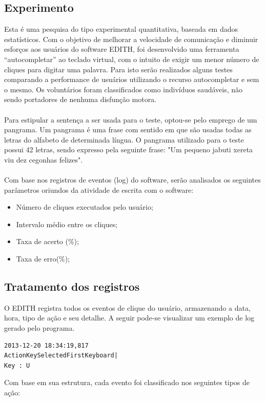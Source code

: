 \documentclass[twoside]{article}
\begin{document}
\begin{multicols}{2}
\subsection{Experimento}
Esta é uma pesquisa do tipo experimental quantitativa, baseada em dados estatísticos. Com o objetivo de melhorar a velocidade de comunicação e diminuir esforços aos usuários do software EDITH, foi desenvolvido uma ferramenta “autocompletar” ao teclado virtual, com o intuito de exigir um menor número de cliques para digitar uma palavra. Para isto serão realizados alguns testes comparando a performance de usuários utilizando o recurso autocompletar e sem o mesmo. Os voluntários foram classificados como indivíduos saudáveis, não sendo portadores de nenhuma disfunção motora. 
\\\\
Para estipular a sentença a ser usada para o teste, optou-se pelo emprego de um pangrama. Um pangrama é uma frase com sentido em que são usadas todas as letras do alfabeto de determinada língua. O pangrama utilizado para o teste possui 42 letras, sendo expresso pela seguinte frase: "Um pequeno jabuti xereta viu dez cegonhas felizes". 
\\\\
Com base nos registros de eventos (log) do software, serão analisados os seguintes parâmetros oriundos da atividade de escrita com o software:
\begin{itemize}
\item Número de cliques executados pelo usuário;
\item Intervalo médio entre os cliques;
\item Taxa de acerto (\%);
\item Taxa de erro(\%);
\end{itemize}

\subsection{Tratamento dos registros}

O EDITH registra todos os eventos de clique do usuário, armazenando a data, hora, tipo de ação e seu detalhe. A seguir pode-se visualizar um exemplo de log gerado pelo programa.

\begin{lstlisting}
2013-12-20 18:34:19,817 
ActionKeySelectedFirstKeyboard|
Key : U
\end{lstlisting}

Com base em sua estrutura, cada evento foi classificado nos seguintes tipos de ação:
\begin{itemize}


\end{itemize}
\end{multicols}
\end{document}
